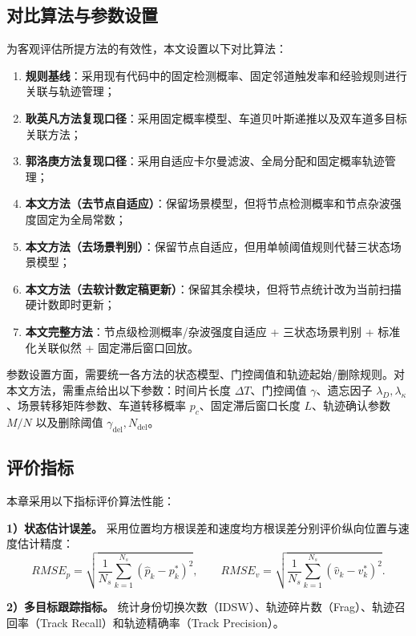 \documentclass{xdupgthesis}
\begin{document}
\subsection{对比算法与参数设置}

为客观评估所提方法的有效性，本文设置以下对比算法：
\begin{enumerate}
	\item \textbf{规则基线}：采用现有代码中的固定检测概率、固定邻道触发率和经验规则进行关联与轨迹管理；
	\item \textbf{耿英凡方法复现口径}：采用固定概率模型、车道贝叶斯递推以及双车道多目标关联方法；
	\item \textbf{郭洛庚方法复现口径}：采用自适应卡尔曼滤波、全局分配和固定概率轨迹管理；
	\item \textbf{本文方法（去节点自适应）}：保留场景模型，但将节点检测概率和节点杂波强度固定为全局常数；
	\item \textbf{本文方法（去场景判别）}：保留节点自适应，但用单帧阈值规则代替三状态场景模型；
	\item \textbf{本文方法（去软计数定稿更新）}：保留其余模块，但将节点统计改为当前扫描硬计数即时更新；
	\item \textbf{本文完整方法}：节点级检测概率/杂波强度自适应 + 三状态场景判别 + 标准化关联似然 + 固定滞后窗口回放。
\end{enumerate}

参数设置方面，需要统一各方法的状态模型、门控阈值和轨迹起始/删除规则。对本文方法，需重点给出以下参数：时间片长度 $\Delta T$、门控阈值 $\gamma$、遗忘因子 $\lambda_D,\lambda_{\kappa}$、场景转移矩阵参数、车道转移概率 $p_c$、固定滞后窗口长度 $L$、轨迹确认参数 $M/N$ 以及删除阈值 $\gamma_{\mathrm{del}},N_{\mathrm{del}}$。
\subsection{评价指标}

本章采用以下指标评价算法性能：

\textbf{1）状态估计误差。} 采用位置均方根误差和速度均方根误差分别评价纵向位置与速度估计精度：
\begin{equation}
	RMSE_p=
	\sqrt{\frac{1}{N_s}\sum_{k=1}^{N_s}(\hat p_k-p_k^{\ast})^2},
	\qquad
	RMSE_v=
	\sqrt{\frac{1}{N_s}\sum_{k=1}^{N_s}(\hat v_k-v_k^{\ast})^2}.
	\label{eq:ch3_rmse_v2}
\end{equation}

\textbf{2）多目标跟踪指标。} 统计身份切换次数（IDSW）、轨迹碎片数（Frag）、轨迹召回率（Track Recall）和轨迹精确率（Track Precision）。
\end{document}
